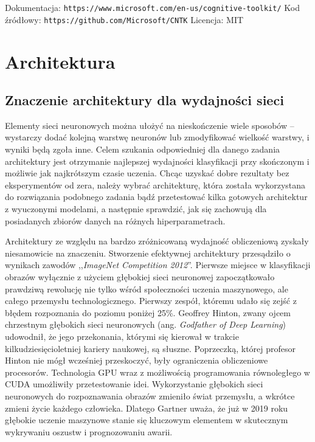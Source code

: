 \documentclass[12pt,a4paper,twoside,titlepage,openright]{book}
\begin{document}
\noindent
\newline
Dokumentacja: \texttt{https://www.microsoft.com/en-us/cognitive-toolkit/}
\newline
Kod źródłowy: \texttt{https://github.com/Microsoft/CNTK}
\newline
Licencja: MIT



\chapter{Architektura}
\section{Znaczenie architektury dla wydajności sieci}
Elementy sieci neuronowych można ułożyć na nieskończenie wiele sposobów -- wystarczy dodać kolejną warstwę neuronów lub zmodyfikować wielkość warstwy, i wyniki będą zgoła inne. Celem szukania odpowiedniej dla danego zadania architektury jest otrzymanie najlepszej wydajności klasyfikacji przy skończonym i możliwie jak najkrótszym czasie uczenia. Chcąc uzyskać dobre rezultaty bez eksperymentów od zera, należy wybrać architekturę, która została wykorzystana do rozwiązania podobnego zadania bądź przetestować kilka gotowych architektur z wyuczonymi modelami, a następnie sprawdzić, jak się zachowują dla posiadanych zbiorów danych na różnych hiperparametrach.

Architektury ze względu na bardzo zróżnicowaną wydajność obliczeniową zyskały niesamowicie na znaczeniu. Stworzenie efektywnej architektury przesądziło o wynikach zawodów ,,\textit{ImageNet Competition 2012}''. Pierwsze miejsce w klasyfikacji obrazów wyłącznie z użyciem głębokiej sieci neuronowej zapoczątkowało prawdziwą rewolucję nie tylko wśród społeczności uczenia maszynowego, ale całego przemysłu technologicznego. Pierwszy zespół, któremu udało się zejść z błędem rozpoznania do poziomu poniżej 25\%. Geoffrey Hinton, zwany ojcem chrzestnym głębokich sieci neuronowych (ang. \textit{Godfather of Deep Learning}) udowodnił, że jego przekonania, którymi się kierował w trakcie kilkudziesięcioletniej kariery naukowej, są słuszne. Poprzeczką, której profesor Hinton nie mógł wcześniej przeskoczyć, były ograniczenia obliczeniowe procesorów. Technologia GPU wraz z możliwością programowania równoległego w CUDA umożliwiły przetestowanie idei. Wykorzystanie głębokich sieci neuronowych do rozpoznawania obrazów zmieniło świat przemysłu, a wkrótce zmieni życie każdego człowieka. Dlatego Gartner uważa, że już w 2019 roku głębokie uczenie maszynowe stanie się kluczowym elementem w skutecznym wykrywaniu oszustw i prognozowaniu awarii.\cite{siteGartner2019}
\end{document}
